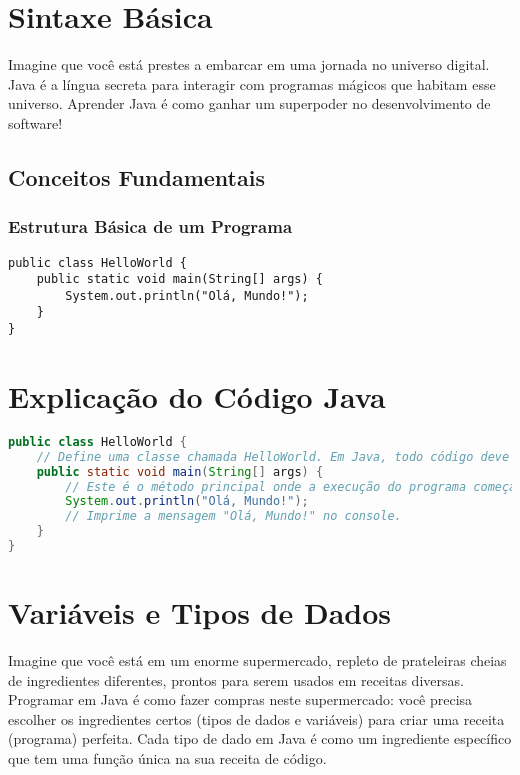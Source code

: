 \documentclass[a4paper,12pt]{book}
\begin{document}
\section{Sintaxe Básica}

Imagine que você está prestes a embarcar em uma jornada no universo digital. Java é a língua secreta para interagir com programas mágicos que habitam esse universo. Aprender Java é como ganhar um superpoder no desenvolvimento de software!

\subsection*{Conceitos Fundamentais}

\subsubsection*{Estrutura Básica de um Programa}
\begin{verbatim}
public class HelloWorld {
    public static void main(String[] args) {
        System.out.println("Olá, Mundo!");
    }
}
\end{verbatim}

\section*{Explicação do Código Java}

\begin{lstlisting}[language=Java, caption=Exemplo de Código Java]
public class HelloWorld {
    // Define uma classe chamada HelloWorld. Em Java, todo código deve estar dentro de uma classe.
    public static void main(String[] args) {
        // Este é o método principal onde a execução do programa começa.
        System.out.println("Olá, Mundo!");
        // Imprime a mensagem "Olá, Mundo!" no console.
    }
}
\end{lstlisting}


\section{Variáveis e Tipos de Dados}

Imagine que você está em um enorme supermercado, repleto de prateleiras cheias de ingredientes diferentes, prontos para serem usados em receitas diversas. Programar em Java é como fazer compras neste supermercado: você precisa escolher os ingredientes certos (tipos de dados e variáveis) para criar uma receita (programa) perfeita. Cada tipo de dado em Java é como um ingrediente específico que tem uma função única na sua receita de código.
\end{document}
